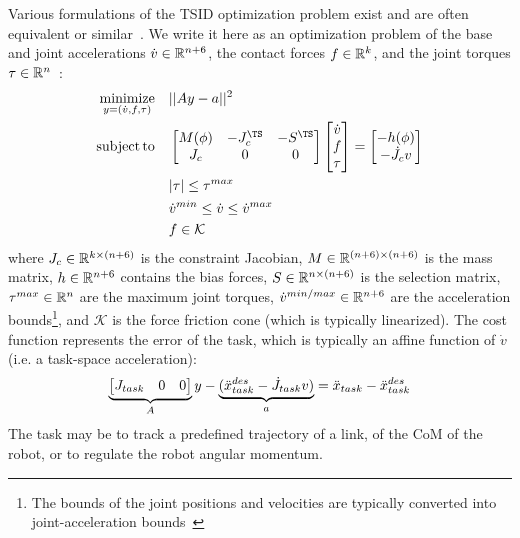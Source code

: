 Various formulations of the TSID optimization problem exist and are often equivalent or similar~\cite{DelPrete2014c}.
We write it here as an optimization problem of the base and joint accelerations $\dot{v} \in \mathbb{R}^{n+6}$, the contact forces \mbox{$f\in \mathbb{R}^{k}$}, and the joint torques $\tau \in \mathbb{R}^{n}$~\cite{Saab2013}:
\begin{subequations} 
\label{eq:TSID}
\begin{align}
\minimize_{y=(\dot{v}, f, \tau)} \quad &|| A y - a||^2 \nonumber\\
\st \quad & \mat{M(\phi) & -J_c^\TS & -S^\TS \\ J_c & 0 & 0} \mat{\dot{v} \\ f \\ \tau} = \mat{- h(\phi) \\ -\dot{J}_c v} \nonumber\\
& | \tau | \le \tau^{max} \label{eq:TSID_torque_lim}\\
& \dot{v}^{min} \le \dot{v} \le \dot{v}^{max} \label{eq:TSID_acc_lim}\\
& f \in \mathcal{K} \label{eq:TSID_force_lim}
\end{align} 
\end{subequations}
where \mbox{$J_c \in \mathbb{R}^{k\times (n+6)}$} is the constraint Jacobian, $M \in \mathbb{R}^{(n+6)\times (n+6)}$ is the mass matrix, $h \in \mathbb{R}^{n+6}$ contains the bias forces, $S\in \mathbb{R}^{n\times (n+6)}$ is the selection matrix, $\tau^{max} \in \mathbb{R}^{n}$ are the maximum joint torques, $\dot{v}^{min/max} \in \mathbb{R}^{n+6}$ are the acceleration bounds\footnote{The bounds of the joint positions and velocities are typically converted into joint-acceleration bounds~\cite{Padois2010}}, and $\mathcal{K}$ is the force friction cone (which is typically linearized).
The cost function represents the error of the task, which is typically an affine function of $\dot{v}$ (i.e. a task-space acceleration):
\begin{equation*} \begin{aligned}
\underbrace{\begin{bmatrix}J_{task} & 0 & 0\end{bmatrix}}_A y - \underbrace{(\ddot{x}_{task}^{des} - \dot{J}_{task} v)}_a = \ddot{x}_{task} - \ddot{x}_{task}^{des}
\end{aligned} \end{equation*}
The task may be to track a predefined trajectory of a link, of the CoM of the robot, or to regulate the robot angular momentum.

